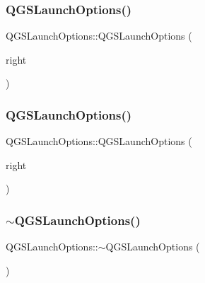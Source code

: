\subsubsection{\texorpdfstring{Q\+G\+S\+Launch\+Options()}{QGSLaunchOptions()}\hspace{0.1cm}{\footnotesize\ttfamily [2/3]}}
{\footnotesize\ttfamily Q\+G\+S\+Launch\+Options\+::\+Q\+G\+S\+Launch\+Options (\begin{DoxyParamCaption}\item[{const \mbox{\hyperlink{class_q_g_s_launch_options}{Q\+G\+S\+Launch\+Options}} \&}]{right }\end{DoxyParamCaption})\hspace{0.3cm}{\ttfamily [default]}}

\mbox{\label{class_q_g_s_launch_options_aa02cb62c82d12907a31d8bb4ea8f65f6}} 
\subsubsection{\texorpdfstring{Q\+G\+S\+Launch\+Options()}{QGSLaunchOptions()}\hspace{0.1cm}{\footnotesize\ttfamily [3/3]}}
{\footnotesize\ttfamily Q\+G\+S\+Launch\+Options\+::\+Q\+G\+S\+Launch\+Options (\begin{DoxyParamCaption}\item[{\mbox{\hyperlink{class_q_g_s_launch_options}{Q\+G\+S\+Launch\+Options}} \&\&}]{right }\end{DoxyParamCaption})\hspace{0.3cm}{\ttfamily [default]}}

\mbox{\label{class_q_g_s_launch_options_a9550062ba7e700f65f1192ab4e8040e5}} 
\subsubsection{\texorpdfstring{$\sim$\+Q\+G\+S\+Launch\+Options()}{~QGSLaunchOptions()}}
{\footnotesize\ttfamily Q\+G\+S\+Launch\+Options\+::$\sim$\+Q\+G\+S\+Launch\+Options (\begin{DoxyParamCaption}{ }\end{DoxyParamCaption})}



